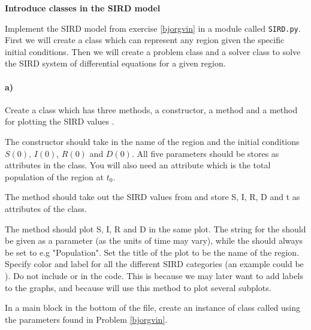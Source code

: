 \begin{Problem}{\textbf{Introduce classes in the SIRD model}}\label{SIRD}

\noindent
Implement the SIRD model from exercise \ref{bjorgvin} in a module called \texttt{SIRD.py}. First we will create a class  which can represent any region given the specific initial conditions. Then we will create a problem class  and a solver class  to solve the SIRD system of differential equations for a given region.

\paragraph{a)}
Create a class  which has three methods, a constructor, a method  and a method for plotting the SIRD values .

The constructor should take in the name of the region and the initial conditions $S(0)$, $I(0)$, $R(0)$ and  $D(0)$. All five parameters should be stores as attributes in the class. You will also need an attribute  which is the total population of the region at $t_0$.

The method  should take out the SIRD values from  and store S, I, R, D and t as attributes of the class.

The method  should plot S, I, R and D in the same plot. The string for the  should be given as a parameter (as the units of time may vary), while the  should always be set to e.g "Population". Set the title of the plot to be the name of the region. Specify color and label for all the different SIRD categories (an example could be \newline {}). Do not include  or  in the code. This is because we may later want to add labels to the graphs, and because will use this method to plot several subplots.

In a main block in the bottom of the file, create an instance of class  called  using the parameters found in Problem \ref{bjorgvin}.


\end{Problem}
